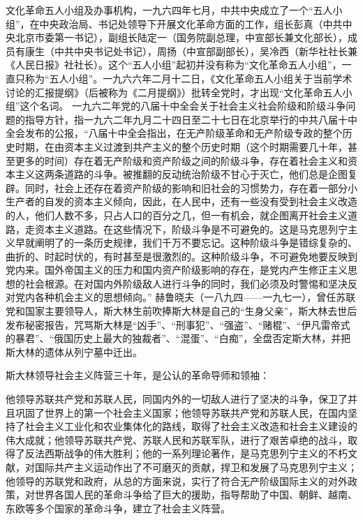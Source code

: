 \begin{maonote}
文化革命五人小组及办事机构，一九六四年七月，中共中央成立了一个“五人小组”，在中央政治局、书记处领导下开展文化革命方面的工作，组长彭真（中共中央北京市委第一书记），副组长陆定一（国务院副总理，中宣部长兼文化部长），成员有康生（中共中央书记处书记），周扬（中宣部副部长），吴冷西（新华社社长兼《人民日报》社社长）。这个“五人小组”起初并没有称为“文化革命五人小组”，一直只称为“五人小组”。一九六六年二月十二日，《文化革命五人小组关于当前学术讨论的汇报提纲》（后被称为《二月提纲》）批转全党时，才出现“文化革命五人小组”这个名词。
一九六二年党的八届十中全会关于社会主义社会阶级和阶级斗争问题的指导方针，指一九六二年九月二十四日至二十七日在北京举行的中共八届十中全会发布的公报，“八届十中全会指出，在无产阶级革命和无产阶级专政的整个历史时期，在由资本主义过渡到共产主义的整个历史时期（这个时期需要几十年，甚至更多的时间）存在着无产阶级和资产阶级之间的阶级斗争，存在着社会主义和资本主义这两条道路的斗争。被推翻的反动统治阶级不甘心于灭亡，他们总是企图复辟。同时，社会上还存在着资产阶级的影响和旧社会的习惯势力，存在着一部分小生产者的自发的资本主义倾向，因此，在人民中，还有一些没有受到社会主义改造的人，他们人数不多，只占人口的百分之几，但一有机会，就企图离开社会主义道路，走资本主义道路。在这些情况下，阶级斗争是不可避免的。这是马克思列宁主义早就阐明了的一条历史规律，我们千万不要忘记。这种阶级斗争是错综复杂的、曲折的、时起时伏的，有时甚至是很激烈的。这种阶级斗争，不可避免地要反映到党内来。国外帝国主义的压力和国内资产阶级影响的存在，是党内产生修正主义思想的社会根源。在对国内外阶级敌人进行斗争的同时，我们必须及时警惕和坚决反对党内各种机会主义的思想倾向。”
赫鲁晓夫（一八九四——一九七一），曾任苏联党和国家主要领导人，斯大林生前吹捧斯大林是自己的“生身父亲”，斯大林去世后发布秘密报告，咒骂斯大林是“凶手”、“刑事犯”、“强盗”、“赌棍”、“伊凡雷帝式的暴君”、“俄国历史上最大的独裁者”、“混蛋”、“白痴”，全盘否定斯大林，并把斯大林的遗体从列宁墓中迁出。

斯大林领导社会主义阵营三十年，是公认的革命导师和领袖：

他领导苏联共产党和苏联人民，同国内外的一切敌人进行了坚决的斗争，保卫了并且巩固了世界上的第一个社会主义国家；他领导苏联共产党和苏联人民，在国内坚持了社会主义工业化和农业集体化的路线，取得了社会主义改造和社会主义建设的伟大成就；他领导苏联共产党、苏联人民和苏联军队，进行了艰苦卓绝的战斗，取得了反法西斯战争的伟大胜利；他的一系列理论著作，是马克思列宁主义的不朽文献，对国际共产主义运动作出了不可磨灭的贡献，捍卫和发展了马克思列宁主义；他领导的苏联党和政府，从总的方面来说，实行了符合无产阶级国际主义的对外政策，对世界各国人民的革命斗争给了巨大的援助，指导帮助了中国、朝鲜、越南、东欧等多个国家的革命斗争，建立了社会主义阵营。


\end{maonote}
